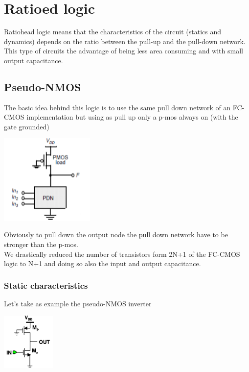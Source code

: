 \chapter{Ratioed logic}
Ratiohead logic means that the characteristics of the circuit (statics and dynamics) depends on the ratio between the pull-up and the pull-down network.\\
This type of circuits the advantage of being less area consuming and with small output capacitance.\\

\section{Pseudo-NMOS}
The basic idea behind this logic is to use the same pull down network of an FC-CMOS implementation but using as pull up only a p-mos always on (with the gate grounded)

\centering
\includegraphics[width=0.35\textwidth]{C7_1.png}\\
\raggedright
       		
Obviously to pull down the output node the pull down network have to be stronger than the p-mos.\\
We drastically reduced the number of transistors form 2N+1 of the FC-CMOS logic to N+1 and doing so also the input and output capacitance.\\

\subsection{Static characteristics}
Let's take as example the pseudo-NMOS inverter

\centering
\includegraphics[width=0.2\textwidth]{C7_2.png}\\
\raggedright

